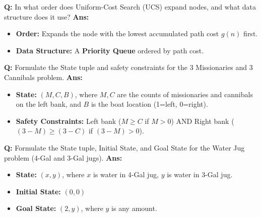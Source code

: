 \documentclass[10pt,a4paper,twocolumn]{article}
\begin{document}
\begin{tcolorbox}[
  colback=white,
  colframe=UnitColorThree,
  colbacktitle=gray!10!white,
  coltitle=black,
  fonttitle=\bfseries\sffamily\small,
  title={Unit III $\bullet$ Card 6: Uniform-Cost Search (UCS) Order},
  boxrule=1.2pt,
  arc=2mm,
  outer arc=2mm,
  boxsep=1.5mm,
  top=1mm,
  bottom=1mm,
  left=1.5mm,
  right=1.5mm,
  before skip=2.5mm,
  after skip=2.5mm
]
\textbf{Q:} In what order does Uniform-Cost Search (UCS) expand nodes, and what data structure does it use?
\tcbline
\textbf{Ans:} \begin{itemize}
  \item   \textbf{Order:} Expands the node with the lowest accumulated path cost $g(n)$ first.
  \item   \textbf{Data Structure:} A \textbf{Priority Queue} ordered by path cost.
\end{itemize}
\end{tcolorbox}


\begin{tcolorbox}[
  colback=white,
  colframe=UnitColorThree,
  colbacktitle=gray!10!white,
  coltitle=black,
  fonttitle=\bfseries\sffamily\small,
  title={Unit III $\bullet$ Card 7: Missionaries \& Cannibals State Formulation},
  boxrule=1.2pt,
  arc=2mm,
  outer arc=2mm,
  boxsep=1.5mm,
  top=1mm,
  bottom=1mm,
  left=1.5mm,
  right=1.5mm,
  before skip=2.5mm,
  after skip=2.5mm
]
\textbf{Q:} Formulate the State tuple and safety constraints for the 3 Missionaries and 3 Cannibals problem.
\tcbline
\textbf{Ans:} \begin{itemize}
  \item   \textbf{State:} $(M, C, B)$, where $M, C$ are the counts of missionaries and cannibals on the left bank, and $B$ is the boat location (1=left, 0=right).
  \item   \textbf{Safety Constraints:} Left bank ($M \ge C$ if $M > 0$) AND Right bank ($(3-M) \ge (3-C)$ if $(3-M) > 0$).
\end{itemize}
\end{tcolorbox}


\begin{tcolorbox}[
  colback=white,
  colframe=UnitColorThree,
  colbacktitle=gray!10!white,
  coltitle=black,
  fonttitle=\bfseries\sffamily\small,
  title={Unit III $\bullet$ Card 8: Water Jug State Formulation},
  boxrule=1.2pt,
  arc=2mm,
  outer arc=2mm,
  boxsep=1.5mm,
  top=1mm,
  bottom=1mm,
  left=1.5mm,
  right=1.5mm,
  before skip=2.5mm,
  after skip=2.5mm
]
\textbf{Q:} Formulate the State tuple, Initial State, and Goal State for the Water Jug problem (4-Gal and 3-Gal jugs).
\tcbline
\textbf{Ans:} \begin{itemize}
  \item   \textbf{State:} $(x, y)$, where $x$ is water in 4-Gal jug, $y$ is water in 3-Gal jug.
  \item   \textbf{Initial State:} $(0, 0)$
  \item   \textbf{Goal State:} $(2, y)$, where $y$ is any amount.
\end{itemize}
\end{tcolorbox}
\end{document}

